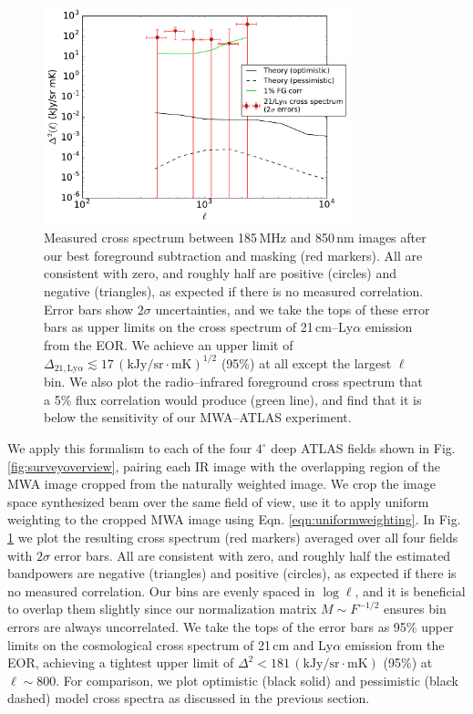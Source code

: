 \documentclass[numberedappendix]{emulateapj}
\begin{document}
\begin{figure}[h]
\centering
\includegraphics[width=3.5in]{chap5_xcor/mwa_atlas_xspec_with_2Dsimtheory_and_2sigma_errors_6bins.pdf}
\caption{Measured cross spectrum between 185\,MHz and 850\,nm images after our best foreground subtraction and masking (red markers). All are consistent with zero, and roughly half are positive (circles) and negative (triangles), as expected if there is no measured correlation. Error bars show $2\sigma$ uncertainties, and we take the tops of these error bars as upper limits on the cross spectrum of 21\,cm--Ly$\alpha$ emission from the EOR. We achieve an upper limit of $\Delta_{21,\text{Ly}\alpha}\lesssim17\,(\text{kJy/sr}\cdot \text{mK})^{1/2}$ (95\%) at all except the largest $\ell$ bin. We also plot the radio--infrared foreground cross spectrum that a 5\% flux correlation would produce (green line), and find that it is below the sensitivity of our MWA--ATLAS experiment.}
\label{fig:resxspec}
\end{figure}

We apply this formalism to each of the four $4^\circ$ deep ATLAS fields shown in Fig. \ref{fig:surveyoverview}, pairing each IR image with the overlapping region of the MWA image cropped from the naturally weighted image. We crop the image space synthesized beam over the same field of view, use it to apply uniform weighting to the cropped MWA image using Eqn. \ref{eqn:uniformweighting}. In Fig. \ref{fig:resxspec} we plot the resulting cross spectrum (red markers) averaged over all four fields with $2\sigma$ error bars. All are consistent with zero, and roughly half the estimated bandpowers are negative (triangles) and positive (circles), as expected if there is no measured correlation. Our bins are evenly spaced in $\log \ell$, and it is beneficial to overlap them slightly since our normalization matrix $M\sim F^{-1/2}$ ensures bin errors are always uncorrelated. We take the tops of the error bars as 95\% upper limits on the cosmological cross spectrum of 21\,cm and Ly$\alpha$ emission from the EOR, achieving a tightest upper limit of $\Delta^2<181$\,$(\text{kJy/sr}\cdot \text{mK})$ (95\%) at $\ell\sim800$. For comparison, we plot optimistic (black solid) and pessimistic (black dashed) model cross spectra as discussed in the previous section.
 
\end{document}
